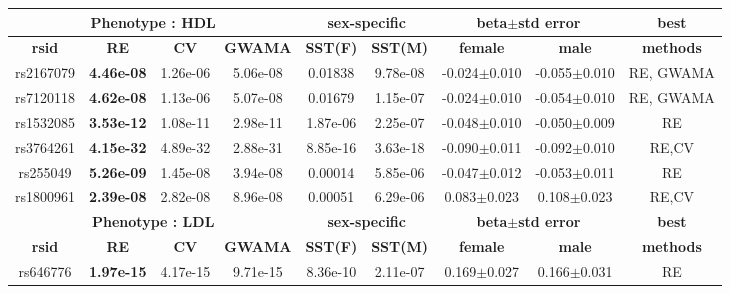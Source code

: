 \documentclass[11pt]{article}
\begin{document}
\begin{table}
{\begin{tabular*}{1.11\textwidth}  {@{\extracolsep{\fill}} |c|c|c|c|c|c|c|c|c|}
\hline
\hline
\multicolumn{4}{|c|}{\textbf{Phenotype : HDL   }} &  \multicolumn{2}{c|}{\textbf{sex-specific}}   & \multicolumn{2}{c|}{\textbf{beta$\pm$std error}} & \textbf{best} \\
\hline
\textbf{rsid}   &  \textbf{RE}  & \textbf{CV}   & \textbf{GWAMA}    & \textbf{SST(F)}   & \textbf{SST(M)}    & \textbf{female}   & \textbf{male} & \textbf{methods}  \\
\hline
\hline
rs2167079 &  \textbf{4.46e-08} & 1.26e-06 &     5.06e-08       &0.01838 & 9.78e-08 &     -0.024$\pm$0.010 & -0.055$\pm$0.010 &  RE, GWAMA \\
rs7120118 &  \textbf{4.62e-08} & 1.13e-06  &    5.07e-08      & 0.01679 & 1.15e-07 &     -0.024$\pm$0.010 & -0.054$\pm$0.010 &  RE, GWAMA \\
 rs1532085 &  \textbf{3.53e-12} & 1.08e-11  &    2.98e-11       &1.87e-06 & 2.25e-07 &     -0.048$\pm$0.010 & -0.050$\pm$0.009 & RE  \\
 rs3764261 &  \textbf{4.15e-32} & 4.89e-32  &    2.88e-31      & 8.85e-16 & 3.63e-18 &    -0.090$\pm$0.011 & -0.092$\pm$0.010 & RE,CV \\
 rs255049 &  \textbf{5.26e-09} & 1.45e-08  &    3.94e-08       &0.00014 & 5.85e-06 &     -0.047$\pm$0.012 & -0.053$\pm$0.011 & RE  \\
 rs1800961 &  \textbf{2.39e-08} & 2.82e-08  &    8.96e-08       &0.00051 & 6.29e-06 &     0.083$\pm$0.023 & 0.108$\pm$0.023 & RE,CV \\
\hline
\hline
\multicolumn{4}{|c|}{\textbf{Phenotype : LDL  }} &  \multicolumn{2}{c|}{\textbf{sex-specific}}   & \multicolumn{2}{c|}{\textbf{beta$\pm$std error}} & \textbf{best}  \\
\hline
\textbf{rsid}   & \textbf{RE}  & \textbf{CV}  & \textbf{GWAMA}    & \textbf{SST(F)}   & \textbf{SST(M)}   & \textbf{female}   & \textbf{male} & \textbf{methods}  \\
\hline
\hline
 rs646776 &  \textbf{1.97e-15} & 4.17e-15 &     9.71e-15      & 8.36e-10 & 2.11e-07 &    0.169$\pm$0.027 & 0.166$\pm$0.031 & RE \\

\end{tabular*}}
\end{table}
\end{document}
